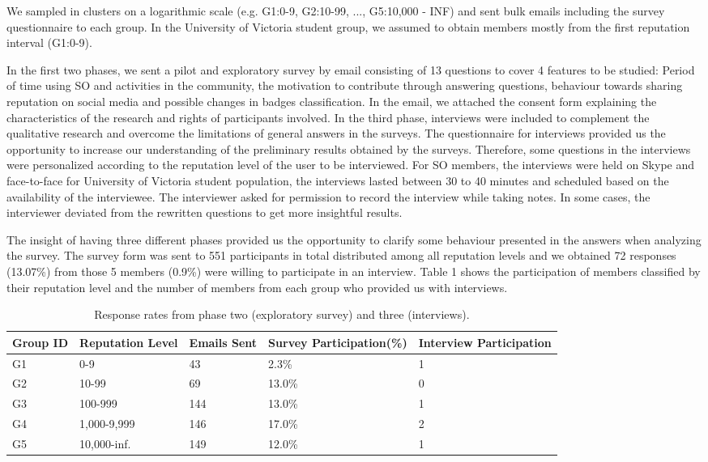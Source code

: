 \documentclass{sigchi}
\begin{document}
We sampled in clusters on a logarithmic scale (e.g. G1:0-9, G2:10-99, ..., G5:10,000 - INF) and sent bulk emails including the survey questionnaire to each group. In the University of Victoria student group, we assumed to obtain members mostly from the first reputation interval (G1:0-9).

In the first two phases, we sent a pilot and exploratory survey by email consisting of 13 questions to cover 4 features to be studied: Period of time using SO and activities in the community, the motivation to contribute through answering questions, behaviour towards sharing reputation on social media and possible changes in badges classification. In the email, we attached the consent form explaining the characteristics of the research and rights of participants involved. In the third phase, interviews were included to complement the qualitative research and overcome the limitations of general answers in the surveys. The questionnaire for interviews provided us the opportunity to increase our understanding of the preliminary results obtained by the surveys. Therefore, some questions in the interviews were personalized according to the reputation level of the user to be interviewed. For SO members, the interviews were held on Skype and face-to-face for University of Victoria student population, the interviews lasted between 30 to 40 minutes and scheduled based on the availability of the interviewee. The interviewer asked for permission to record the interview while taking notes. In some cases, the interviewer deviated from the rewritten questions to get more insightful results.

The insight of having three different phases provided us the opportunity to clarify some behaviour presented in the answers when analyzing the survey. The survey form was sent to 551 participants in total distributed among all reputation levels and we obtained 72 responses (13.07\%) from those 5 members (0.9\%) were willing to participate in an interview. Table 1 shows the participation of members classified by their reputation level and the number of members from each group who provided us with interviews.

\begin{table}
	\centering
	\begin{tabular}{ p{1.0cm} p{1.6cm} p{0.9cm} p{1.8cm} p{1.4cm} }
	\toprule
	\textbf{Group ID} & \textbf{Reputation Level} & \textbf{Emails Sent} & \textbf{Survey Participation(\%)} & \textbf{Interview Participation } \\
	\midrule
	G1 & 0-9 & 43 & 2.3\% & 1 \\
	G2 & 10-99 & 69 & 13.0\% & 0 \\
	G3 & 100-999 & 144 & 13.0\% & 1 \\
	G4 & 1,000-9,999 & 146 & 17.0\% & 2 \\
	G5 & 10,000-inf. & 149 & 12.0\% & 1 \\
	\bottomrule
	\end{tabular}
	\caption{Response rates from phase two (exploratory survey) and three (interviews).}~\label{tab:table1}
\end{table}
\end{document}
